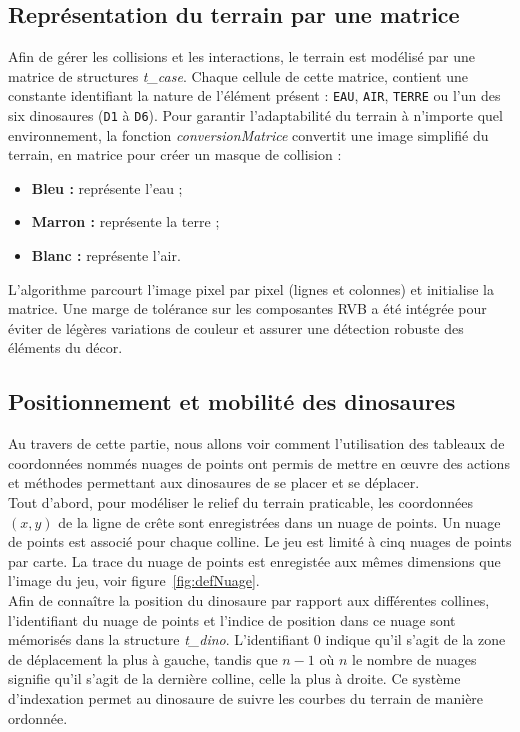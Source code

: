 \documentclass[11pt,a4paper]{article}
\begin{document}
\subsection{Représentation du terrain par une matrice}
Afin de gérer les collisions et les interactions, le terrain est modélisé par une matrice de structures \textit{t\_case}. Chaque cellule de cette matrice, contient une constante identifiant la nature de l'élément présent : \texttt{EAU}, \texttt{AIR}, \texttt{TERRE} ou l'un des six dinosaures (\texttt{D1} à \texttt{D6}).
Pour garantir l'adaptabilité du terrain à n'importe quel environnement, la fonction \textit{conversionMatrice} convertit une image simplifié du terrain, en matrice pour créer un masque de collision :
\begin{itemize}
    \item \textbf{Bleu :} représente l'eau ;
    \item \textbf{Marron :} représente la terre ;
    \item \textbf{Blanc :} représente l'air.
\end{itemize}
L'algorithme parcourt l'image pixel par pixel (lignes et colonnes) et initialise la matrice. Une marge de tolérance sur les composantes RVB a été intégrée pour éviter de légères variations de couleur et assurer une détection robuste des éléments du décor.
\\

\subsection{Positionnement et mobilité des dinosaures}
Au travers de cette partie, nous allons voir comment l'utilisation des tableaux de coordonnées nommés nuages de points ont permis de mettre en œuvre des actions et méthodes permettant aux dinosaures de se placer et se déplacer.\\

Tout d'abord, pour modéliser le relief du terrain praticable, les coordonnées $(x,y)$ de la ligne de crête sont enregistrées dans un nuage de points. Un nuage de points est associé pour chaque colline. Le jeu est limité à cinq nuages de points par carte. La trace du nuage de points est enregistée aux mêmes dimensions que l'image du jeu, voir figure~\ref{fig:defNuage}.\\
Afin de connaître la position du dinosaure par rapport aux différentes collines, l’identifiant du nuage de points et l’indice de position dans ce nuage  sont mémorisés dans la structure \textit{\mbox{t\_dino}}. L’identifiant $0$ indique qu’il s’agit de la zone de déplacement la plus à gauche, tandis que $n-1$ où $n$ le nombre de nuages signifie qu'il s'agit de la dernière colline, celle la plus à droite. Ce système d’indexation permet au dinosaure de suivre les courbes du terrain de manière ordonnée.\\ 
\end{document}
